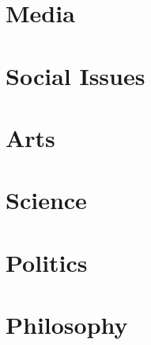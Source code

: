 \documentclass[a4paper]{article}
\begin{document}
\begin{multicols}{2}

\section{Media}





\section{Social Issues}










\section{Arts}



\section{Science}






\section{Politics}





\section{Philosophy}




\end{multicols}
\end{document}
